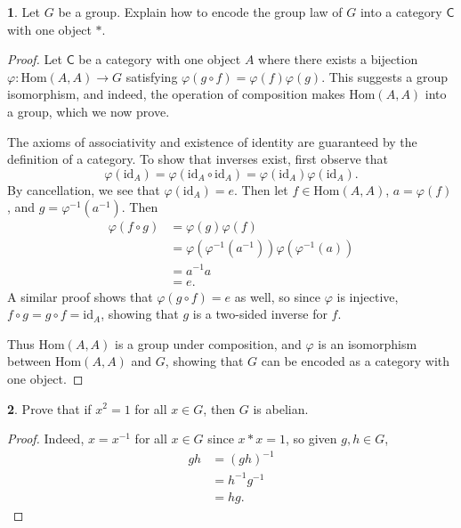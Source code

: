 \documentclass[12pt]{article}
\theoremstyle{definition}
\newtheorem{ex}{}
\begin{document}
\begin{ex}
	Let $G$ be a group.
	Explain how to encode the group law of $G$ into a category $\mathsf{C}$ with one object $*$.
\end{ex}
\begin{proof}
	Let $\mathsf{C}$ be a category with one object $A$ where there exists a bijection $\varphi: \mathrm{Hom}(A, A) \to G$ satisfying $\varphi(g \circ f) = \varphi(f)\varphi(g)$.
	This suggests a group isomorphism, and indeed, the operation of composition makes $\mathrm{Hom}(A, A)$ into a group, which we now prove.

	The axioms of associativity and existence of identity are guaranteed by the definition of a category.
	To show that inverses exist, first observe that \begin{equation*}
		\varphi(\mathrm{id}_A) = \varphi(\mathrm{id}_A \circ \mathrm{id}_A) = \varphi(\mathrm{id}_A)\varphi(\mathrm{id}_A).
	\end{equation*}
	By cancellation, we see that $\varphi(\mathrm{id}_A) = e$.
	Then let $f \in \mathrm{Hom}(A, A)$, $a = \varphi(f)$, and $g = \varphi^{-1}(a^{-1})$.
	Then \begin{align*}
		\varphi(f \circ g) & = \varphi(g)\varphi(f)                                  \\
		                   & = \varphi(\varphi^{-1}(a^{-1}))\varphi(\varphi^{-1}(a)) \\
		                   & = a^{-1}a                                               \\
		                   & = e.
	\end{align*}
	A similar proof shows that $\varphi(g \circ f) = e$ as well, so since $\varphi$ is injective, $f \circ g = g \circ f = \mathrm{id}_A$, showing that $g$ is a two-sided inverse for $f$.

	Thus $\mathrm{Hom}(A, A)$ is a group under composition, and $\varphi$ is an isomorphism between $\mathrm{Hom}(A, A)$ and $G$, showing that $G$ can be encoded as a category with one object.
\end{proof}

\begin{ex}
	Prove that if $x^2 = 1$ for all $x \in G$, then $G$ is abelian.
\end{ex}
\begin{proof}
	Indeed, $x = x^{-1}$ for all $x \in G$ since $x * x = 1$, so given $g, h \in G$, \begin{align*}
		gh & = (gh)^{-1}    \\
		   & = h^{-1}g^{-1} \\
		   & = hg.
	\end{align*}
\end{proof}
\end{document}
